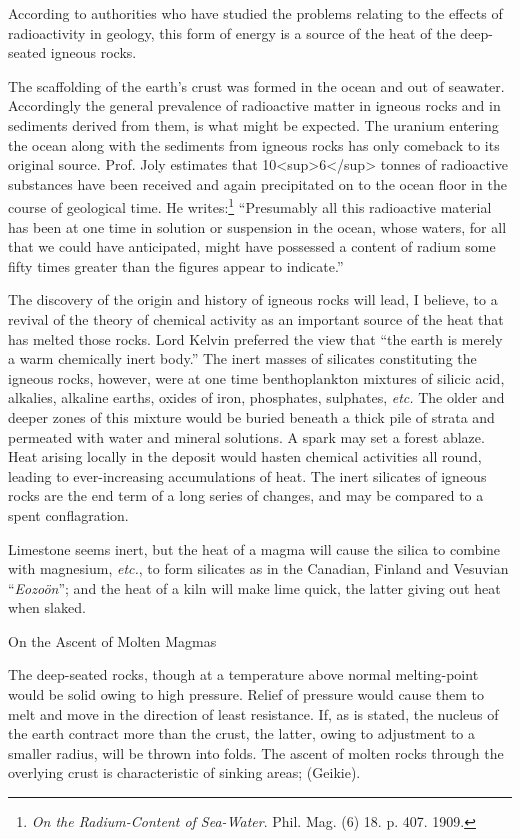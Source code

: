 \documentclass[a4paper, 12pt, oneside]{article}
\begin{document}
According to authorities who have studied the problems relating to the effects of radioactivity in geology, this form of energy is a source of the heat of the deep-seated igneous rocks.

The scaffolding of the earth's crust was formed in the ocean and out of seawater. Accordingly the general prevalence of radioactive matter in igneous rocks and in sediments derived from them, is what might be expected. The uranium entering the ocean along with the sediments from igneous rocks has only comeback to its original source. Prof. Joly estimates that 10<sup>6</sup> tonnes of radioactive substances have been received and again precipitated on to the ocean floor in the course of geological time. He writes:\footnote{\emph{On the Radium-Content of Sea-Water}. Phil. Mag. (6) 18. p. 407. 1909.} ``Presumably all this radioactive material has been at one time in solution or suspension in the ocean, whose waters, for all that we could have anticipated, might have possessed a content of radium some fifty times greater than the figures appear to indicate.''

The discovery of the origin and history of igneous rocks will lead, I believe, to a revival of the theory of chemical activity as an important source of the heat that has melted those rocks. Lord Kelvin preferred the view that ``the earth is merely a warm chemically inert body.'' The inert masses of silicates constituting the igneous rocks, however, were at one time benthoplankton mixtures of silicic acid, alkalies, alkaline earths, oxides of iron, phosphates, sulphates, \emph{etc.} The older and deeper zones of this mixture would be buried beneath a thick pile of strata and permeated with water and mineral solutions. A spark may set a forest ablaze. Heat arising locally in the deposit would hasten chemical activities all round, leading to ever-increasing accumulations of heat. The inert silicates of igneous rocks are the end term of a long series of changes, and may be compared to a spent conflagration.

Limestone seems inert, but the heat of a magma will cause the silica to combine with magnesium, \emph{etc.}, to form silicates as in the Canadian, Finland and Vesuvian ``\emph{Eozoön}''; and the heat of a kiln will make lime quick, the latter giving out heat when slaked.

On the Ascent of Molten Magmas

The deep-seated rocks, though at a temperature above normal melting-point would be solid owing to high pressure. Relief of pressure would cause them to melt and move in the direction of least resistance. If, as is stated, the nucleus of the earth contract more than the crust, the latter, owing to adjustment to a smaller radius, will be thrown into folds. The ascent of molten rocks through the overlying crust is characteristic of sinking areas; (Geikie).
\end{document}
